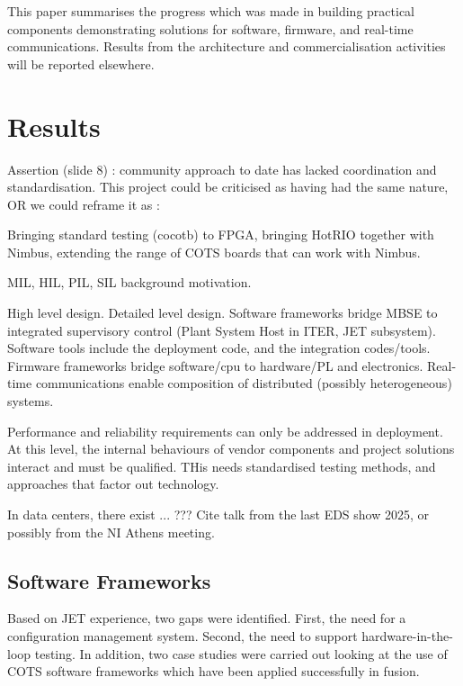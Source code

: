 \documentclass[preprint]{elsarticle}
\begin{document}
This paper summarises the progress which was made in building practical components demonstrating
solutions for software, firmware, and real-time communications. Results from the architecture 
and commercialisation activities will be reported elsewhere.


\section{Results}

Assertion (slide 8) : community approach to date has lacked coordination and standardisation.
This project could be criticised as having had the same nature, OR we could reframe it as :

Bringing standard testing (cocotb) to FPGA, bringing HotRIO together with Nimbus, 
extending the range of COTS boards that can work with Nimbus.

MIL, HIL, PIL, SIL background motivation.

High level design.  Detailed level design.  Software frameworks bridge MBSE to integrated supervisory control
(Plant System Host in ITER, JET subsystem).  Software tools include the deployment code, and the integration codes/tools.
Firmware frameworks bridge software/cpu to hardware/PL and electronics.
Real-time communications enable composition of distributed (possibly heterogeneous) systems.

Performance and reliability requirements can only be addressed in deployment.  At this level, the internal
behaviours of vendor components and project solutions interact and must be qualified.
THis needs standardised testing methods, and approaches that factor out technology.

In data centers, there exist ... ???  Cite talk from the last EDS show 2025, or possibly from the NI Athens meeting.


\subsection{Software Frameworks}

Based on JET experience, two gaps were identified.  First, the need for a configuration management system.
Second, the need to support hardware-in-the-loop testing.  In addition, two case studies were carried out
looking at the use of COTS software frameworks which have been applied successfully in fusion.
\end{document}
